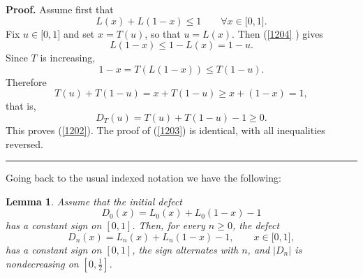 \documentclass[onecolumn]{article}
\newtheorem{lemma}[theorem]{Lemma}
\newenvironment{proof}[1][Proof]{\noindent\textbf{#1.} }{\ \rule{0.5em}{0.5em}}
\begin{document}
\begin{proof}
\noindent Assume first that 
\begin{equation}
L(x)+L(1-x)\leq 1\qquad \forall x\in \lbrack 0,1].  \label{1204}
\end{equation}%
Fix $u\in \lbrack 0,1]$ and set $x=T(u)$, so that $u=L(x)$. Then (\ref{1204}%
) gives 
\begin{equation}
L(1-x)\leq 1-L(x)=1-u.  \label{1205}
\end{equation}%
Since $T$ is increasing, 
\begin{equation}
1-x=T(L(1-x))\leq T(1-u).  \label{1206}
\end{equation}%
Therefore 
\begin{equation}
T(u)+T(1-u)=x+T(1-u)\geq x+(1-x)=1,  \label{1207}
\end{equation}%
that is, 
\begin{equation}
D_{T}(u)=T(u)+T(1-u)-1\geq 0.  \label{1208}
\end{equation}%
This proves (\ref{1202}). The proof of (\ref{1203}) is identical, with all
inequalities reversed.
\end{proof}

Going back to the usual indexed notation we have the following:\hfill

\begin{lemma}
\label{defect-shape} Assume that the initial defect 
\begin{equation}
D_{0}(x)=L_{0}(x)+L_{0}(1-x)-1  \label{1209}
\end{equation}%
has a constant sign on $[0,1]$. Then, for every $n\geq 0$, the defect 
\begin{equation}
D_{n}(x)=L_{n}(x)+L_{n}(1-x)-1,\qquad x\in \lbrack 0,1],  \label{1210}
\end{equation}%
has a constant sign on $[0,1]$, the sign alternates with $n$, and $|D_{n}|$
is nondecreasing on $[0,\tfrac{1}{2}]$.
\end{lemma}
\end{document}
